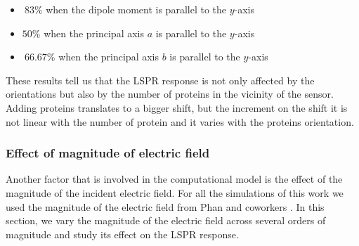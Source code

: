  \begin{itemize}
     \item {$~83\%$ when the dipole moment is parallel to the $y$-axis}
     \item {$50\%$ when the principal axis $a$ is parallel to the $y$-axis}
     \item {$~66.67\%$ when the principal axis $b$ is parallel to the $y$-axis}
 \end{itemize}    

These results tell us that the LSPR response is not only affected by the orientations but also by the number of proteins 
in the vicinity of the sensor. Adding proteins translates to a bigger shift, but the increment on the shift it is not linear with the 
number of protein and it varies with the proteins orientation.

\subsubsection{Effect of magnitude of electric field}

Another factor that is involved in the computational model is the effect of the magnitude 
of the incident electric field. For all the simulations of this work we used the magnitude of the electric field from Phan and 
coworkers \cite{PhanETal2013}. In this section, we vary the magnitude of the electric field across several orders of magnitude 
and study its effect on the LSPR response. 

